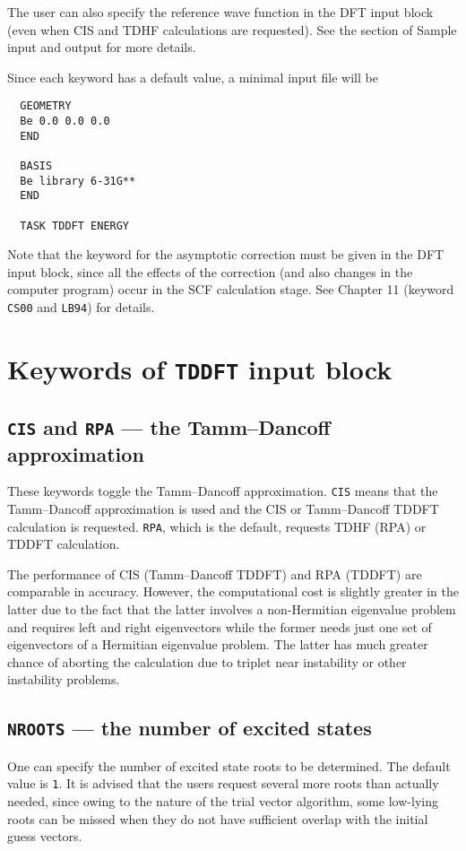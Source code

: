 The user can also specify the reference wave function in the DFT input block
(even when CIS and TDHF calculations are requested).  See the section of Sample
input and output for more details.

Since each keyword has a default value, a minimal input file will be
\begin{verbatim}
  GEOMETRY
  Be 0.0 0.0 0.0
  END

  BASIS
  Be library 6-31G**
  END

  TASK TDDFT ENERGY
\end{verbatim}

Note that the keyword for the asymptotic correction must be given in the 
DFT input block, since all the effects of the correction (and also changes in the 
computer program) occur in the SCF calculation stage.  See Chapter 11 (keyword \verb+CS00+ and
\verb+LB94+) for details.

\section{Keywords of {\tt TDDFT} input block}

\subsection{{\tt CIS} and {\tt RPA} --- the Tamm--Dancoff approximation}

These keywords toggle the Tamm--Dancoff approximation.  \verb+CIS+ means
that the Tamm--Dancoff approximation is used and the CIS or Tamm--Dancoff TDDFT
calculation is requested.  \verb+RPA+, which is the default, requests 
TDHF (RPA) or TDDFT calculation.

The performance of CIS (Tamm--Dancoff TDDFT) and RPA (TDDFT) are comparable in
accuracy.  However, the computational cost is slightly greater in the latter due to
the fact that the latter involves a non-Hermitian eigenvalue problem and requires
left and right eigenvectors while the former needs just one set of eigenvectors of 
a Hermitian eigenvalue problem.  The latter has much greater chance of
aborting the calculation due to triplet near instability or other instability 
problems.

\subsection{{\tt NROOTS} --- the number of excited states}

One can specify the number of excited state roots to be determined.  The default 
value is \verb+1+.  It is advised that the users request several more roots than actually
needed, since owing to the nature of the trial vector algorithm, some low-lying
roots can be missed when they do not have sufficient overlap with the initial guess
vectors.

